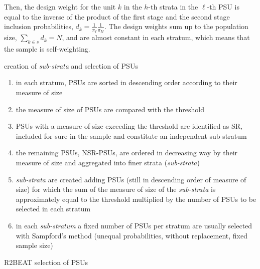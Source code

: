 Then, the design weight for the unit $k$ in the $h$-th strata in the $\ell$-th PSU is equal to the inverse of the product of the first stage and the second stage inclusion probabilities, 
$
d_k = \frac{1}{\pi_{I}} \frac{1}{\pi_{II}}.     
$
The design weights sum up to the population size, $\sum_{k \in s} d_k = N$, and are almost constant in each stratum, which means that the sample is self-weighting.
\begin{algorithm}[h!]
	\SetAlgoLined
	
	\BlankLine
	\BlankLine
	\BlankLine
	 creation of \textit{sub-strata} and selection of PSUs\;
	\begin{enumerate} 
		\item in each stratum, PSUs are sorted in descending order 
		according to their measure of size\;
		\item the measure of size of PSUs are compared with the 
		threshold\;
		\item PSUs with a measure of size exceeding the threshold 
		are identified as SR, included for sure in the sample and constitute an independent sub-stratum\;
		\item  the remaining PSUs, NSR-PSUs, are ordered in 
		decreasing way by their measure of size and aggregated into finer strata (\textit{sub-strata})\;
		\item \textit{sub-strata} are created adding PSUs (still 
		in descending order of measure of size) for which the sum of the measure of size of the \textit{sub-strata} is approximately equal to the threshold multiplied by the number of PSUs to be selected in each stratum\;
		\item in each \textit{sub-stratum} a fixed number of PSUs 
		per stratum are usually selected with Sampford's method (unequal probabilities, without replacement, fixed sample size)\;
	\end{enumerate}
	\caption{R2BEAT selection of PSUs}
	\label{algorithm2}
\end{algorithm}

